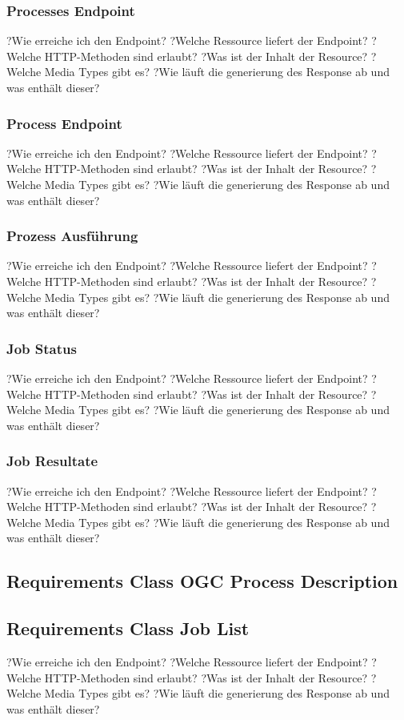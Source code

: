 \subsubsection{Processes Endpoint}
?Wie erreiche ich den Endpoint?
?Welche Ressource liefert der Endpoint?
?Welche HTTP-Methoden sind erlaubt?
?Was ist der Inhalt der Resource?
?Welche Media Types gibt es?
?Wie läuft die generierung des Response ab und was enthält dieser?
\subsubsection{Process Endpoint}?Wie erreiche ich den Endpoint?
?Welche Ressource liefert der Endpoint?
?Welche HTTP-Methoden sind erlaubt?
?Was ist der Inhalt der Resource?
?Welche Media Types gibt es?
?Wie läuft die generierung des Response ab und was enthält dieser?

\subsubsection{Prozess Ausführung}
?Wie erreiche ich den Endpoint?
?Welche Ressource liefert der Endpoint?
?Welche HTTP-Methoden sind erlaubt?
?Was ist der Inhalt der Resource?
?Welche Media Types gibt es?
?Wie läuft die generierung des Response ab und was enthält dieser?
\subsubsection{Job Status}?Wie erreiche ich den Endpoint?
?Welche Ressource liefert der Endpoint?
?Welche HTTP-Methoden sind erlaubt?
?Was ist der Inhalt der Resource?
?Welche Media Types gibt es?
?Wie läuft die generierung des Response ab und was enthält dieser?
\subsubsection{Job Resultate}
?Wie erreiche ich den Endpoint?
?Welche Ressource liefert der Endpoint?
?Welche HTTP-Methoden sind erlaubt?
?Was ist der Inhalt der Resource?
?Welche Media Types gibt es?
?Wie läuft die generierung des Response ab und was enthält dieser?
\subsection{Requirements Class OGC Process Description}
\subsection{Requirements Class Job List}
?Wie erreiche ich den Endpoint?
?Welche Ressource liefert der Endpoint?
?Welche HTTP-Methoden sind erlaubt?
?Was ist der Inhalt der Resource?
?Welche Media Types gibt es?
?Wie läuft die generierung des Response ab und was enthält dieser?
